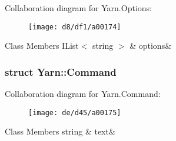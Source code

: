 Collaboration diagram for Yarn.\-Options\-:
\nopagebreak
\begin{figure}[H]
\begin{center}
\leavevmode
\texttt{[image: d8/df1/a00174]}
\end{center}
\end{figure}
\begin{DoxyFields}{Class Members}
\hypertarget{a00026_ae8c616d923ceeeed192a9436c55d9917}{I\-List$<$ string $>$}\label{a00026_ae8c616d923ceeeed192a9436c55d9917}
&
options&
\\
\hline

\end{DoxyFields}
\label{de/db9/a00159}
\hypertarget{a00026_de/db9/a00159}{}
\subsubsection{struct Yarn\-:\-:Command}


Collaboration diagram for Yarn.\-Command\-:
\nopagebreak
\begin{figure}[H]
\begin{center}
\leavevmode
\texttt{[image: de/d45/a00175]}
\end{center}
\end{figure}
\begin{DoxyFields}{Class Members}
\hypertarget{a00026_a8564e5104566e145f5d917ec846444d9}{string}\label{a00026_a8564e5104566e145f5d917ec846444d9}
&
text&
\\
\hline

\end{DoxyFields}


